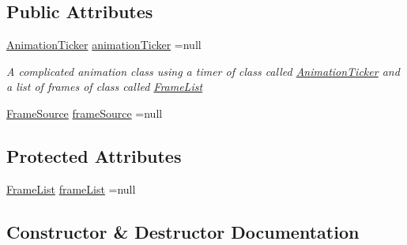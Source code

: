 \subsection*{Public Attributes}
\begin{DoxyCompactItemize}
\item 
\mbox{\hyperlink{class_r_c___framework_1_1_animation_ticker}{Animation\+Ticker}} \mbox{\hyperlink{class_r_c___framework_1_1_animation_frame_list_a41409ce75f3131d7008e249296cb95a6}{animation\+Ticker}} =null
\begin{DoxyCompactList}\small\item\em A complicated animation class using a timer of class called \mbox{\hyperlink{class_r_c___framework_1_1_animation_ticker}{Animation\+Ticker}} and a list of frames of class called \mbox{\hyperlink{class_r_c___framework_1_1_frame_list}{Frame\+List}} \end{DoxyCompactList}\item 
\mbox{\hyperlink{class_r_c___framework_1_1_frame_source}{Frame\+Source}} \mbox{\hyperlink{class_r_c___framework_1_1_animation_frame_list_a3dd60d9e75ce6498504a04894f8626bc}{frame\+Source}} =null
\end{DoxyCompactItemize}
\subsection*{Protected Attributes}
\begin{DoxyCompactItemize}
\item 
\mbox{\hyperlink{class_r_c___framework_1_1_frame_list}{Frame\+List}} \mbox{\hyperlink{class_r_c___framework_1_1_animation_frame_list_a138734a263190761b0da537fb830f2a9}{frame\+List}} =null
\end{DoxyCompactItemize}


\subsection{Constructor \& Destructor Documentation}
\mbox{\label{class_r_c___framework_1_1_animation_frame_list_ad4853f5ccf776a762d4a3ca431cf623f}} 
